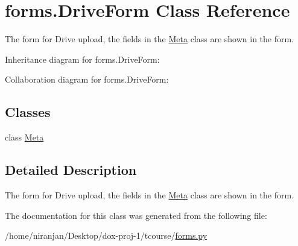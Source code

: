\hypertarget{classforms_1_1_drive_form}{}\section{forms.\+Drive\+Form Class Reference}
\label{classforms_1_1_drive_form}


The form for Drive upload, the fields in the \hyperlink{classforms_1_1_drive_form_1_1_meta}{Meta} class are shown in the form.  




Inheritance diagram for forms.\+Drive\+Form\+:


Collaboration diagram for forms.\+Drive\+Form\+:
\subsection*{Classes}
\begin{DoxyCompactItemize}
\item 
class \hyperlink{classforms_1_1_drive_form_1_1_meta}{Meta}
\end{DoxyCompactItemize}


\subsection{Detailed Description}
The form for Drive upload, the fields in the \hyperlink{classforms_1_1_drive_form_1_1_meta}{Meta} class are shown in the form. 

The documentation for this class was generated from the following file\+:\begin{DoxyCompactItemize}
\item 
/home/niranjan/\+Desktop/dox-\/proj-\/1/tcourse/\hyperlink{forms_8py}{forms.\+py}\end{DoxyCompactItemize}
